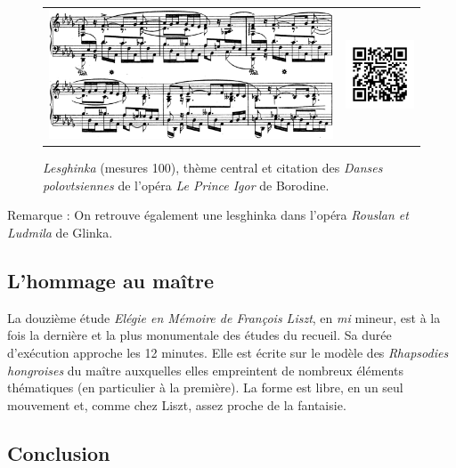 \begin{figure}[!ht]
  \begin{bigcenter}
    \vspace*{-0.5cm}
    \begin{tabular}{lr}
      \includegraphics[width=12.5cm, keepaspectratio]{lesghinka-theme3.png}
      &
      \includegraphics[width=3cm, keepaspectratio]{op11-qr.png}
    \end{tabular}
  \end{bigcenter}
  \caption{\label{lesghinka-3}\emph{Lesghinka} (mesures 100), thème central et citation des \emph{Danses polovtsiennes} de l’opéra \emph{Le Prince Igor} de Borodine.}
\end{figure}

Remarque : On retrouve également une lesghinka dans l'opéra \emph{Rouslan et Ludmila} de Glinka.

\subsection{L'hommage au maître}

La douzième étude \emph{Elégie en Mémoire de François Liszt}, en \emph{mi} mineur, est à la fois la dernière et la plus monumentale des études du recueil. Sa durée d'exécution approche les 12 minutes. Elle est écrite sur le modèle des \emph{Rhapsodies hongroises} du maître auxquelles elles empreintent de nombreux éléments thématiques (en particulier à la première). La forme est libre, en un seul mouvement et, comme chez Liszt, assez proche de la fantaisie.

\subsection{Conclusion}

